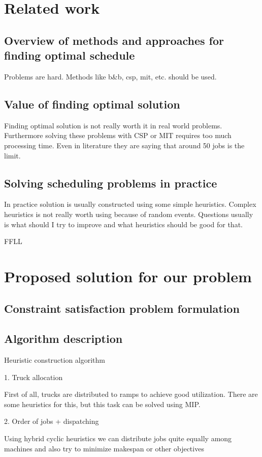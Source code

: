 \documentclass{ctuthesis}
\begin{document}
\chapter{Related work}

\section{Overview of methods and approaches for finding optimal schedule}
Problems are hard. Methods like b\&b, csp, mit, etc. should be used.
\section{Value of finding optimal solution}
Finding optimal solution is not really worth it in real world problems. Furthermore solving these problems with CSP or MIT requires too much processing time. Even in literature they are saying that around 50 jobs is the limit. 
\section{Solving scheduling problems in practice}
In practice solution is usually constructed using some simple heuristics. Complex heuristics is not really worth using because of random events. Questions usually is what should I try to improve and what heuristics should be good for that. 

FFLL 
\chapter{Proposed solution for our problem}
\section{Constraint satisfaction problem formulation}
\section{Algorithm description}
Heuristic construction algorithm

1. Truck allocation

First of all, trucks are distributed to ramps to achieve good utilization. There are some heuristics for this, but this task can be solved using MIP.

2. Order of jobs + dispatching

Using hybrid cyclic heuristics we can distribute jobs quite equally among machines and also try to minimize makespan or other objectives
\end{document}
